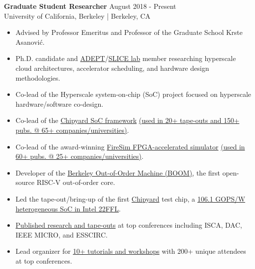 \documentclass[line]{res}
\begin{document}
\begin{resume}
\textbf{Graduate Student Researcher} \hfill August 2018 - Present
\\
University of California, Berkeley | Berkeley, CA
\\
\vspace{-3mm}
\begin{itemize}
\item Advised by Professor Emeritus and Professor of the Graduate School Krste Asanovi\'c.
\item Ph.D. candidate and \href{https://adept.eecs.berkeley.edu/}{ADEPT}/\href{https://slice.eecs.berkeley.edu/}{SLICE lab} member researching hyperscale cloud architectures, accelerator scheduling, and hardware design methodologies.
\item Co-lead of the Hyperscale system-on-chip (SoC) project focused on hyperscale hardware/software co-design.
\item Co-lead of the \href{https://github.com/ucb-bar/chipyard}{Chipyard SoC framework} \href{https://scholar.google.com/scholar?cites=4549882523608568335&as_sdt=2005&sciodt=0,5&hl=en}{(used in 20+ tape-outs and 150+ pubs. @ 65+ companies/universities)}.
\item Co-lead of the award-winning \href{https://fires.im/}{FireSim FPGA-accelerated simulator} \href{https://fires.im/publications/#userpapers}{(used in 60+ pubs. @ 25+ companies/universities)}.
\item Developer of the \href{https://boom-core.org/}{Berkeley Out-of-Order Machine (BOOM)}, the first open-source RISC-V out-of-order core.
\item Led the tape-out/bring-up of the first \hyperref[sec:chipyard]{Chipyard} test chip, a \href{https://ieeexplore.ieee.org/abstract/document/9567768}{106.1 GOPS/W heterogeneous SoC in Intel 22FFL}.
\item \href{https://scholar.google.com/citations?user=dsAQJ4cAAAAJ&hl=en}{Published research and tape-outs} at top conferences including ISCA, DAC, IEEE MICRO, and ESSCIRC.
\item Lead organizer for \href{https://fires.im/blog/}{10+ tutorials and workshops} with 200+ unique attendees at top conferences.
\end{itemize}

\vspace{-3mm}


\end{resume}
\end{document}
